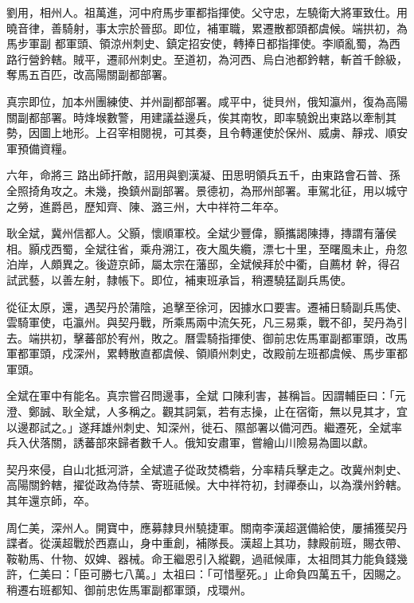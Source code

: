 \begin{pinyinscope}
 劉用，相州人。祖萬進，河中府馬步軍都指揮使。父守忠，左驍衛大將軍致仕。用曉音律，善騎射，事太宗於晉邸。即位，補軍職，累遷散都頭都虞候。端拱初，為馬步軍副
 都軍頭、領涼州刺史、鎮定招安使，轉捧日都指揮使。李順亂蜀，為西路行營鈐轄。賊平，遷祁州刺史。至道初，為河西、烏白池都鈐轄，斬首千餘級，奪馬五百匹，改高陽關副都部署。



 真宗即位，加本州團練使、并州副都部署。咸平中，徙貝州，俄知瀛州，復為高陽關副都部署。時烽堠數警，用建議益邊兵，俟其南牧，即率驍銳出東路以牽制其勢，因圖上地形。上召宰相閱視，可其奏，且令轉運使於保州、威虜、靜戎、順安軍預備資糧。



 六年，命將三
 路出師扞敵，詔用與劉漢凝、田思明領兵五千，由東路會石普、孫全照掎角攻之。未幾，換鎮州副部署。景德初，為邢州部署。車駕北征，用以城守之勞，進爵邑，歷知齊、陳、潞三州，大中祥符二年卒。



 耿全斌，冀州信都人。父顥，懷順軍校。全斌少豐偉，顥攜謁陳摶，摶謂有藩侯相。顥戍西蜀，全斌往省，乘舟溯江，夜大風失纜，漂七十里，至曙風未止，舟忽泊岸，人頗異之。後遊京師，屬太宗在藩邸，全斌候拜於中衢，自薦材
 幹，得召試武藝，以善左射，隸帳下。即位，補東班承旨，稍遷驍猛副兵馬使。



 從征太原，還，遇契丹於蒲陰，追擊至徐河，因據水口要害。遷補日騎副兵馬使、雲騎軍使，屯瀛州。與契丹戰，所乘馬兩中流矢死，凡三易乘，戰不卻，契丹為引去。端拱初，擊蕃部於宥州，敗之。曆雲騎指揮使、御前忠佐馬軍副都軍頭，改馬軍都軍頭，戍深州，累轉散直都虞候、領順州刺史，改殿前左班都虞候、馬步軍都軍頭。



 全斌在軍中有能名。真宗嘗召問邊事，全斌
 口陳利害，甚稱旨。因謂輔臣曰：「元澄、鄭誠、耿全斌，人多稱之。觀其詞氣，若有志操，止在宿衛，無以見其才，宜以邊郡試之。」遂拜雄州刺史、知深州，徙石、隰部署以備河西。繼遷死，全斌率兵入伏落關，誘蕃部來歸者數千人。俄知安肅軍，嘗繪山川險易為圖以獻。



 契丹來侵，自山北抵河滸，全斌遣子從政焚橋砦，分率精兵擊走之。改冀州刺史、高陽關鈐轄，擢從政為侍禁、寄班祗候。大中祥符初，封禪泰山，以為濮州鈐轄。其年還京師，卒。



 周仁美，深州人。開寶中，應募隸貝州驍捷軍。關南李漢超選備給使，屢捕獲契丹諜者。從漢超戰於西嘉山，身中重創，補隊長。漢超上其功，隸殿前班，賜衣帶、鞍勒馬、什物、奴婢、器械。命王繼恩引入縱觀，過祗候庫，太祖問其力能負錢幾許，仁美曰：「臣可勝七八萬。」太祖曰：「可惜壓死。」止命負四萬五千，因賜之。稍遷右班都知、御前忠佐馬軍副都軍頭，戍環州。




\end{pinyinscope}
